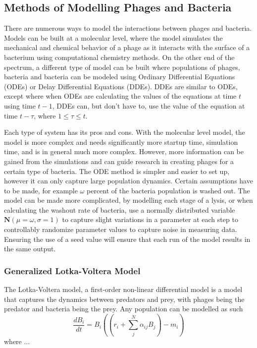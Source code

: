 \subsection{Methods of Modelling Phages and Bacteria}
There are numerous ways to model the interactions between phages and bacteria. Models can be built at a molecular level, where the model simulates the mechanical and chemical behavior of a phage as it interacts with the surface of a bacterium using computational chemistry methods. On the other end of the spectrum, a different type of model can be built where populations of phages, bacteria and bacteria can be modeled using Ordinary Differential Equations (ODEs) or Delay Differential Equations (DDEs). DDEs are similar to ODEs, except where when ODEs are calculating the values of the equations at time $t$ using time $t-1$, DDEs can, but don't have to, use the value of the equation at time $t-\tau$, where $1 \leq \tau \leq t$. \newline 

Each type of system has its pros and cons. With the molecular level model, the model is more complex and needs significantly more startup time, simulation time, and is in general much more complex. However, more information can be gained from the simulations and can guide research in creating phages for a certain type of bacteria. The ODE method is simpler and easier to set up, however it can only capture large population dynamics. Certain assumptions have to be made, for example $\omega$ percent of the bacteria population is washed out. The model can be made more complicated, by modelling each stage of a lysis, or when calculating the washout rate of bacteria, use a normally distributed variable $\textbf{N}(\mu=\omega, \sigma=1)$ to capture slight variations in a parameter at each step to controllably randomize parameter values to capture noise in measuring data. Ensuring the use of a seed value will ensure that each run of the model results in the same output. 

\subsubsection{Generalized Lotka-Voltera Model}
The Lotka-Voltera model, a first-order non-linear differential model is a model that captures the dynamics between predators and prey, with phages being the predator and bacteria being the prey. Any population can be modelled as such
\[ 
    \frac{d{B}_i}{dt} = {B}_i \left(\left(r_i + \sum_{j}^{N} \alpha_{ij}{B}_j \right) - m_i\right)
\]
where ... 

